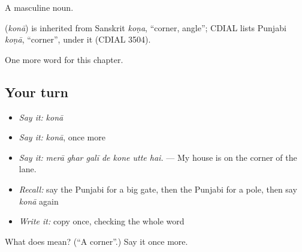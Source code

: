 A masculine noun.

\begin{cousinweb}
\textbf{} (\emph{konā}) is inherited from Sanskrit \emph{koṇa}, \textquotedblleft{}corner, angle\textquotedblright{}; CDIAL lists Punjabi \emph{koṇā}, \textquotedblleft{}corner\textquotedblright{}, under it (CDIAL 3504).
\end{cousinweb}

\begin{grammarlens}[title={What you've built}]
One more word for this chapter.
\end{grammarlens}

\subsection*{Your turn}
\begin{itemize}
\raggedright
  \item \emph{Say it:} \emph{konā}
  \item \emph{Say it:} \emph{konā}, once more
  \item \emph{Say it:} \emph{merā ghar galī de kone utte hai.} — My house is on the corner of the lane.
  \item \emph{Recall:} say the Punjabi for a big gate, then the Punjabi for a pole, then say \emph{konā} again
  \item \emph{Write it:} copy \textbf{} once, checking the whole word
\end{itemize}

\begin{tcolorbox}[breakable,colback=teal!4,colframe=teal!35!black,title={Before you move on}]
What does  mean? (\textquotedblleft{}A corner\textquotedblright{}.) Say it once more.
\end{tcolorbox}
